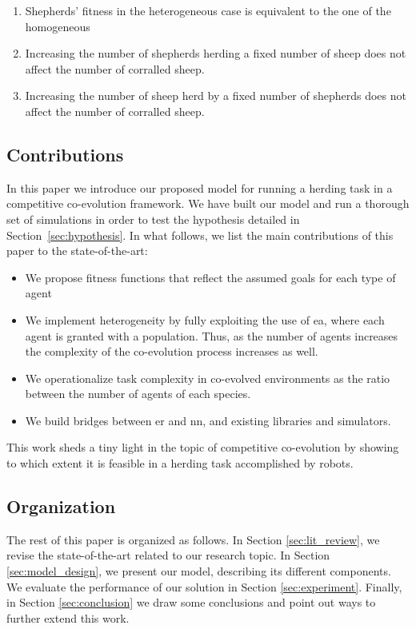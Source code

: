 \documentclass[conference]{IEEEtran}
\begin{document}
\begin{enumerate}
	\item Shepherds' fitness in the heterogeneous case is equivalent to the one of the homogeneous
	\item Increasing the number of shepherds herding a fixed number of sheep does not affect the number of corralled sheep.
	\item Increasing the number of sheep herd by a fixed number of shepherds does not affect the number of corralled sheep.
\end{enumerate}

\subsection{Contributions}
In this paper we introduce our proposed model for running a herding task in a competitive co-evolution framework. 
We have built our model and run a thorough set of simulations in order to test the hypothesis detailed in Section~\ref{sec:hypothesis}. 
In what follows, we list the main contributions of this paper to the state-of-the-art:
\begin{itemize}
	\item We propose fitness functions that reflect the assumed goals for each type of agent
	\item We implement heterogeneity by fully exploiting the use of \gls{ea}, where each agent is granted with a population. Thus, as the number of agents increases the complexity of the co-evolution process increases as well.
	\item We operationalize task complexity in co-evolved environments as the ratio between the number of agents of each species.
	\item We build bridges between \gls{er} and \gls{nn}, and existing libraries and simulators.
\end{itemize}

This work sheds a tiny light in the topic of competitive co-evolution by showing to which extent it is feasible in a herding task accomplished by robots.

\subsection{Organization}
The rest of this paper is organized as follows. 
In Section \ref{sec:lit_review}, we revise the state-of-the-art related to our research topic. 
In Section \ref{sec:model_design}, we present our model, describing its different components. 
We evaluate the performance of our solution in Section \ref{sec:experiment}. 
Finally, in Section \ref{sec:conclusion} we draw some conclusions and point out ways to further extend this work.
\end{document}

